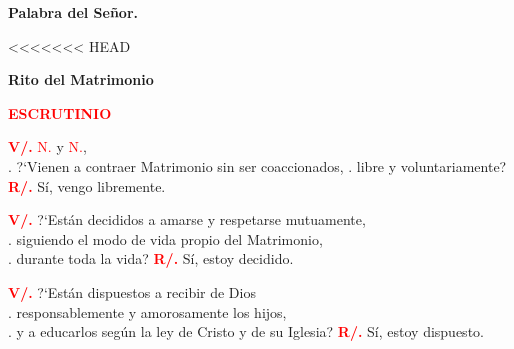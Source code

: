 \documentclass[12pt, letterpaper, spanish]{report}
\begin{document}
{\bfseries Palabra del Se\~nor.} \newline

<<<<<<< HEAD
\newpage

\begin{center} 
\Huge {\bfseries Rito del Matrimonio}
\end{center}

\vspace{1cm}

\Large {\bfseries \textcolor{red}{ESCRUTINIO}} \newline

\Large \hspace{-0.9cm} {\bfseries \textcolor{red}{V/.}} \hspace{0.5cm} \textcolor{red}{N.} y \textcolor{red}{N.}, \\
.\hspace{1.5cm} ?`Vienen a contraer Matrimonio sin ser coaccionados, \newline
.\hspace{1.5cm}  libre y voluntariamente? \newline
\Large {\bfseries \textcolor{red}{R/.}} \hspace{0.5cm} S\'i, vengo libremente. \newline

\Large \hspace{-0.9cm}  {\bfseries \textcolor{red}{V/.}} \hspace{0.5cm} ?`Est\'an decididos a amarse y respetarse mutuamente, \\
.\hspace{1.5cm} siguiendo el modo de vida propio del Matrimonio, \\
.\hspace{1.5cm} durante toda la vida? \newline
\Large {\bfseries \textcolor{red}{R/.}} \hspace{0.5cm} S\'i, estoy decidido. \newline

\Large \hspace{-0.9cm} {\bfseries \textcolor{red}{V/.}} \hspace{0.5cm} ?`Est\'an dispuestos a recibir de Dios \\
.\hspace{1.5cm} responsablemente y amorosamente los hijos, \\
.\hspace{1.5cm} y a educarlos seg\'un la ley de Cristo y de su Iglesia? \newline
\Large {\bfseries \textcolor{red}{R/.}} \hspace{0.5cm} S\'i, estoy dispuesto. \newline
\end{document}
